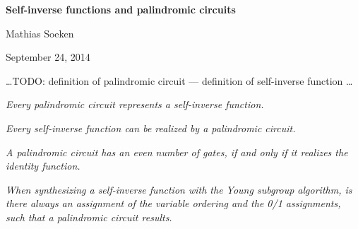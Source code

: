 \magnification\magstephalf
\parskip3pt
\baselineskip14pt

\centerline{\bf Self-inverse functions and palindromic circuits}
\centerline{Mathias Soeken}
\centerline{September 24, 2014}

\bigskip
\bigskip

\dots TODO: definition of palindromic circuit --- definition of self-inverse function \dots

\bigskip

 \sl Every palindromic circuit represents a self-inverse
function.\rm

\smallskip {} \sl Every self-inverse function can be
realized by a palindromic circuit.\rm

\smallskip {} \sl A palindromic circuit has an even number
of gates, if and only if it realizes the identity function. \rm

\smallskip {} \sl When synthesizing a self-inverse
function with the Young subgroup algorithm, is there always an assignment of the
variable ordering and the 0/1 assignments, such that a palindromic circuit
results. \rm

\bye
